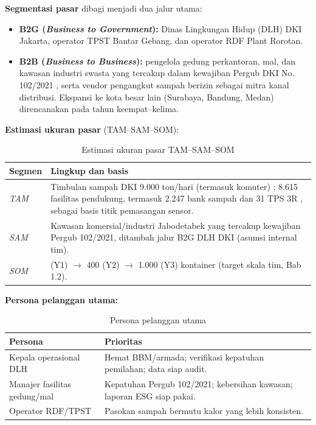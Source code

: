 \textbf{Segmentasi pasar} dibagi menjadi dua jalur utama:
\begin{itemize}[leftmargin=1.5cm]
  \item \textbf{B2G (\textit{Business to Government}):} Dinas Lingkungan Hidup (DLH) DKI Jakarta, operator TPST Bantar Gebang, dan operator RDF Plant Rorotan.
  \item \textbf{B2B (\textit{Business to Business}):} pengelola gedung perkantoran, mal, dan kawasan industri swasta yang tercakup dalam kewajiban Pergub DKI No. 102/2021 \parencite{pergub102}, serta vendor pengangkut sampah berizin sebagai mitra kanal distribusi. Ekspansi ke kota besar lain (Surabaya, Bandung, Medan) direncanakan pada tahun keempat--kelima.
\end{itemize}

\textbf{Estimasi ukuran pasar} (TAM--SAM--SOM):
\begin{table}[H]
\footnotesize
\renewcommand{\arraystretch}{0.85}
\begin{tabularx}{\textwidth}{|>{\RaggedRight\arraybackslash}p{1.6cm}|>{\RaggedRight\arraybackslash}X|}
\hline
\textbf{Segmen} & \textbf{Lingkup dan basis} \\
\hline
\textit{TAM} & Timbulan sampah DKI \textpm{}9.000 ton/hari (termasuk komuter) \parencite{kompaspunya2026}; 8.615 fasilitas pendukung, termasuk 2.247 bank sampah dan 31 TPS 3R \parencite{tvrinetwork2026}, sebagai basis titik pemasangan sensor. \\
\hline
\textit{SAM} & Kawasan komersial/industri Jabodetabek yang tercakup kewajiban Pergub 102/2021, ditambah jalur B2G DLH DKI (asumsi internal tim). \\
\hline
\textit{SOM} & 75 (Y1) $\rightarrow$ 400 (Y2) $\rightarrow$ 1.000 (Y3) kontainer (target skala tim, Bab 1.2). \\
\hline
\end{tabularx}
\caption{Estimasi ukuran pasar TAM--SAM--SOM}
\end{table}

\textbf{Persona pelanggan utama:}
\begin{table}[H]
\footnotesize
\renewcommand{\arraystretch}{0.85}
\begin{tabularx}{\textwidth}{|>{\RaggedRight\arraybackslash}p{4.2cm}|>{\RaggedRight\arraybackslash}X|}
\hline
\textbf{Persona} & \textbf{Prioritas} \\
\hline
Kepala operasional DLH & Hemat BBM/armada; verifikasi kepatuhan pemilahan; data siap audit. \\
\hline
Manajer fasilitas gedung/mal & Kepatuhan Pergub 102/2021; kebersihan kawasan; laporan ESG siap pakai. \\
\hline
Operator RDF/TPST & Pasokan sampah bermutu kalor yang lebih konsisten. \\
\hline
\end{tabularx}
\caption{Persona pelanggan utama \ProductName{}}
\end{table}

